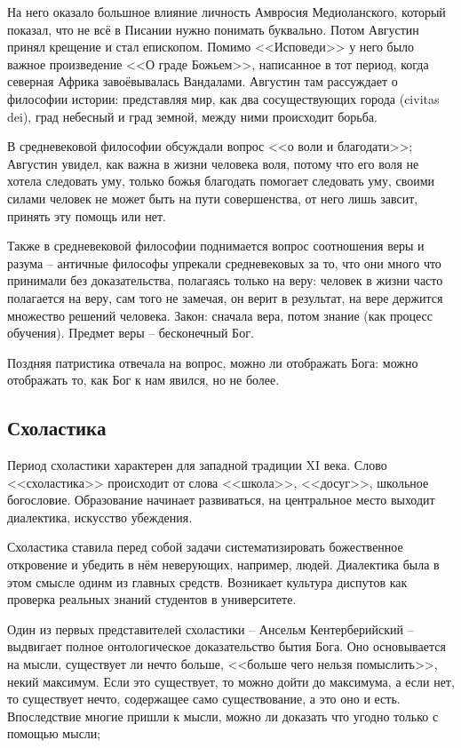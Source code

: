 \documentclass[a4paper, 12pt]{book} %
\begin{document}
На него оказало большное влияние личность Амвросия Медиоланского, который показал, что не всё в Писании нужно понимать буквально. Потом Августин принял крещение и стал епископом. Помимо <<Исповеди>> у него было важное произведение <<О граде Божьем>>, написанное в тот период, когда северная Африка завоёвывалась Вандалами. Августин там рассуждает о философии истории: представляя мир, как два сосуществующих города  (civitas dei), град небесный и град земной, между ними происходит борьба.

 В средневековой философии обсуждали вопрос <<о воли и благодати>>; Августин увидел, как важна в жизни человека воля, потому что его воля не хотела следовать уму, только божья благодать помогает следовать уму, своими силами человек не может быть на пути совершенства, от него лишь завсит, принять эту помощь или нет.
 
Также в средневековой философии поднимается вопрос соотношения веры и разума -- античные философы упрекали средневековых за то, что они много что принимали без доказательства, полагаясь только на веру: человек в жизни часто полагается на веру, сам того не замечая, он верит в результат, на вере держится множество решений человека. Закон: сначала вера, потом знание (как процесс обучения). Предмет веры -- бесконечный Бог.

Поздняя патристика отвечала на вопрос, можно ли отображать Бога: можно отображать то, как Бог к нам явился, но не более.


\subsection{Схоластика}
Период схоластики характерен для западной традиции XI века.
Слово <<схоластика>> происходит от слова <<школа>>, <<досуг>>, школьное богословие. Образование начинает развиваться, на центральное место выходит диалектика, искусство убеждения.

Схоластика ставила перед собой задачи систематизировать божественное откровение и убедить в нём неверующих, например, людей. Диалектика была в этом смысле одинм из главных средств. Возникает культура диспутов как проверка реальных знаний студентов в университете.

Один из первых представителей схоластики -- Ансельм Кентерберийский -- выдвигает полное онтологическое доказательство бытия Бога. Оно основывается на мысли, существует ли нечто больше, <<больше чего нельзя помыслить>>, некий максимум. Если это существует, то можно дойти до максимума, а если нет, то существует нечто, содержащее само существование, а это оно и есть. Впоследствие многие пришли к мысли, можно ли доказать что угодно только с помощью мысли; 
\end{document}
